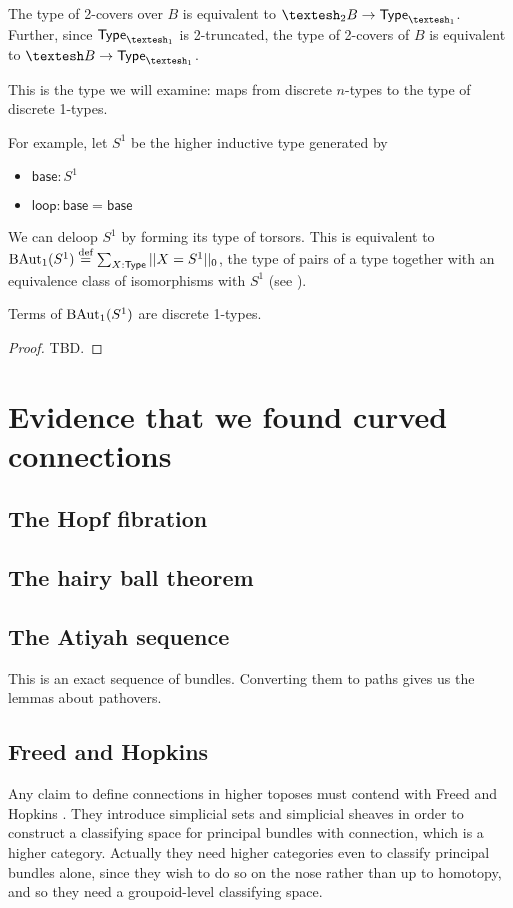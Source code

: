 \documentclass[12pt]{article}
\begin{document}
\begin{mylemma}
  The type of 2-covers over \(B\) is equivalent to \(\shapet B \to \Typeo\). Further, since \(\Typeo\) is 2-truncated, the type of 2-covers of \(B\) is equivalent to \(\shape B\to \Typeo\).
\end{mylemma}

This is the type we will examine: maps from discrete \( n \)-types to the type of discrete 1-types.

For example, let \(S^1\) be the higher inductive type generated by
\begin{itemize}
\item \( \mathsf{base}:S^1 \)
\item \( \mathsf{loop}:\mathsf{base}=\mathsf{base} \)
\end{itemize}

We can deloop \(S^1\) by forming its type of torsors. This is equivalent to \(\mathrm{BAut}_1(S^1)\stackrel{\textup{def}}{=}\sum_{X:\mathsf{Type}}||X=S^1||_0\), the type of pairs of a type together with an equivalence class of isomorphisms with \( S^1 \) (see \cite{buchholtz2023central}). 

\begin{mylemma}Terms of \( \mathrm{BAut}_1(S^1) \) are discrete 1-types.\end{mylemma}\begin{proof} TBD.\end{proof}

\section{Evidence that we found curved connections}

\subsection{The Hopf fibration}

\subsection{The hairy ball theorem}

\subsection{The Atiyah sequence}

This is an exact sequence of bundles. Converting them to paths gives us the lemmas about pathovers.

\subsection{Freed and Hopkins}
Any claim to define connections in higher toposes must contend with Freed and Hopkins \cite{freed2013chernweil}. They introduce simplicial sets and simplicial sheaves in order to construct a classifying space for principal bundles with connection, which is a higher category. Actually they need higher categories even to classify principal bundles alone, since they wish to do so on the nose rather than up to homotopy, and so they need a groupoid-level classifying space.
\end{document}
